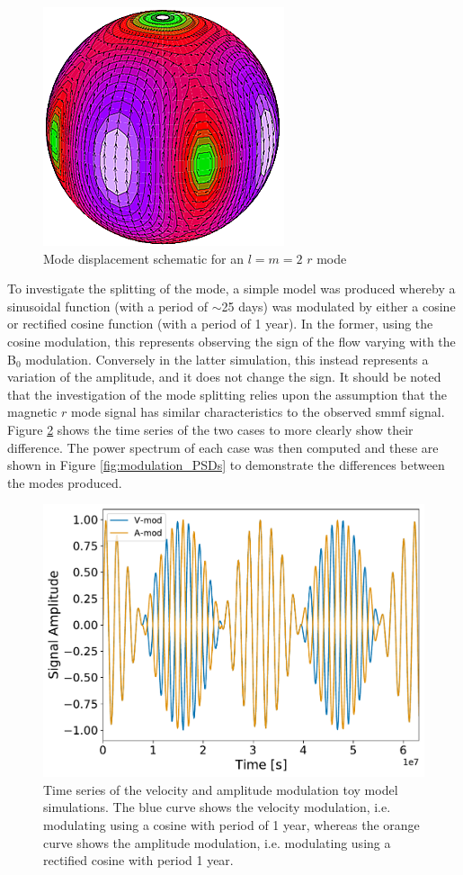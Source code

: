 \begin{figure}[!ht]
	\centering
	\includegraphics[scale=0.7]{l2m2.png}
	\caption{Mode displacement schematic for an $l=m=2$ $r$ mode \citep{strohmayer_neutron_2014}}  \label{fig:l2m2}
\end{figure}

To investigate the splitting of the mode, a simple model was produced whereby a sinusoidal function (with a period of $\sim$25 days) was modulated by either a cosine or rectified cosine function (with a period of 1 year). In the former, using the cosine modulation, this represents observing the sign of the flow varying with the B$_0$ modulation. Conversely in the latter simulation, this instead represents a variation of the amplitude, and it does not change the sign. It should be noted that the investigation of the mode splitting relies upon the assumption that the magnetic $r$ mode signal has similar characteristics to the observed \gls{smmf} signal. Figure \ref{fig:modulation} shows the time series of the two cases to more clearly show their difference. The power spectrum of each case was then computed and these are shown in Figure \ref{fig:modulation_PSDs} to demonstrate the differences between the modes produced.

\begin{figure}[!ht]
	\centering
	\includegraphics[width=0.65\columnwidth]{modulation_plot.pdf}
	\caption{Time series of the velocity and amplitude modulation toy model simulations. The blue curve shows the velocity modulation, i.e. modulating using a cosine with period of 1 year, whereas the orange curve shows the amplitude modulation, i.e. modulating using a rectified cosine with period 1 year.}  \label{fig:modulation}
\end{figure}

